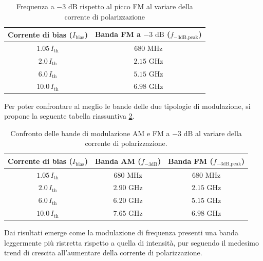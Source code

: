 \begin{table}[!h]
    \centering
    \begin{tabular}{c c}
        \hline
        \textbf{Corrente di bias ($I_{\text{bias}}$)} & \textbf{Banda FM a $-3\text{ dB}$ ($f_{-3\text{dB,peak}}$)} \\
        \hline
        $1.05 \, I_{\text{th}}$ & $680  \text{ MHz}$ \\
        $2.0 \, I_{\text{th}}$  & $2.15 \text{ GHz}$ \\
        $6.0 \, I_{\text{th}}$  & $5.15 \text{ GHz}$ \\
        $10.0 \, I_{\text{th}}$ & $6.98 \text{ GHz}$ \\
        \hline
    \end{tabular}
    \caption{Frequenza a $-3\text{ dB}$ rispetto al picco FM al variare della corrente di polarizzazione}
    \label{tab:bandaFM_3dB}
\end{table}

\noindent Per poter confrontare al meglio le bande delle due tipologie di modulazione, si propone la seguente tabella riassuntiva \ref{tab:confronto_AM_FM}.

\begin{table}[!h]
    \centering
    \begin{tabular}{|c|c|c|}
        \hline
        \textbf{Corrente di bias ($I_{\text{bias}}$)} & \textbf{Banda AM ($f_{-3\text{dB}}$)} & \textbf{Banda FM ($f_{-3\text{dB,peak}}$)} \\ \hline \hline
        $1.05 \, I_{\text{th}}$ & $680 \text{ MHz}$ & $680 \text{ MHz}$ \\ \hline
        $2.0 \, I_{\text{th}}$  & $2.90 \text{ GHz}$ & $2.15 \text{ GHz}$ \\ \hline
        $6.0 \, I_{\text{th}}$  & $6.20 \text{ GHz}$ & $5.15 \text{ GHz}$ \\ \hline
        $10.0 \, I_{\text{th}}$ & $7.65 \text{ GHz}$ & $6.98 \text{ GHz}$ \\  \hline
    \end{tabular}
    \caption{Confronto delle bande di modulazione AM e FM a $-3\text{ dB}$ al variare della corrente di polarizzazione.}
    \label{tab:confronto_AM_FM}
\end{table}

\noindent Dai risultati emerge come la modulazione di frequenza presenti una banda leggermente più ristretta rispetto a quella di intensità, pur seguendo il medesimo trend
di crescita all'aumentare della corrente di polarizzazione.

